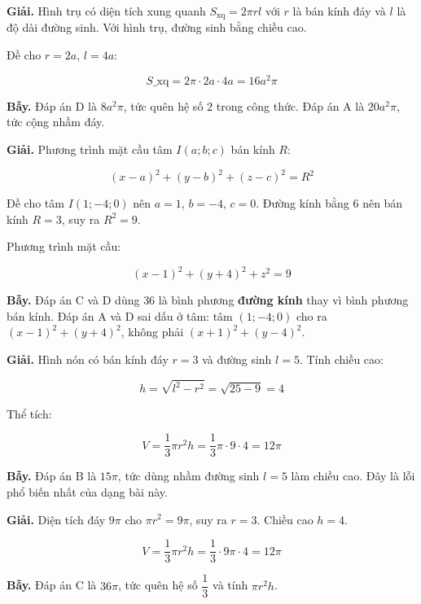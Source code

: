 \documentclass[11pt, a4paper]{article}
\begin{document}
\begin{dapan}[3 — Đáp án B]
\textbf{Giải.} Hình trụ có diện tích xung quanh $S_{\text{xq}} = 2\pi r l$ với $r$ là bán kính đáy và $l$ là độ dài đường sinh. Với hình trụ, đường sinh bằng chiều cao.

Đề cho $r = 2a$, $l = 4a$:

$$S\_{\text{xq}} = 2\pi \cdot 2a \cdot 4a = 16a^2\pi$$

\textbf{Bẫy.} Đáp án D là $8a^2\pi$, tức quên hệ số $2$ trong công thức. Đáp án A là $20a^2\pi$, tức cộng nhầm đáy.
\end{dapan}

\begin{dapan}[4 — Đáp án B]
\textbf{Giải.} Phương trình mặt cầu tâm $I(a;b;c)$ bán kính $R$:

$$(x-a)^2 + (y-b)^2 + (z-c)^2 = R^2$$

Đề cho tâm $I(1;-4;0)$ nên $a = 1$, $b = -4$, $c = 0$. Đường kính bằng $6$ nên bán kính $R = 3$, suy ra $R^2 = 9$.

Phương trình mặt cầu:

$$(x-1)^2 + (y+4)^2 + z^2 = 9$$

\textbf{Bẫy.} Đáp án C và D dùng $36$ là bình phương \textbf{đường kính} thay vì bình phương bán kính. Đáp án A và D sai dấu ở tâm: tâm $(1;-4;0)$ cho ra $(x-1)^2 + (y+4)^2$, không phải $(x+1)^2 + (y-4)^2$.
\end{dapan}

\begin{dapan}[5 — Đáp án A]
\textbf{Giải.} Hình nón có bán kính đáy $r = 3$ và đường sinh $l = 5$. Tính chiều cao:

$$h = \sqrt{l^2 - r^2} = \sqrt{25 - 9} = 4$$

Thể tích:

$$V = \frac{1}{3}\pi r^2 h = \frac{1}{3}\pi \cdot 9 \cdot 4 = 12\pi$$

\textbf{Bẫy.} Đáp án B là $15\pi$, tức dùng nhầm đường sinh $l = 5$ làm chiều cao. Đây là lỗi phổ biến nhất của dạng bài này.
\end{dapan}

\begin{dapan}[6 — Đáp án B]
\textbf{Giải.} Diện tích đáy $9\pi$ cho $\pi r^2 = 9\pi$, suy ra $r = 3$. Chiều cao $h = 4$.

$$V = \frac{1}{3}\pi r^2 h = \frac{1}{3} \cdot 9\pi \cdot 4 = 12\pi$$

\textbf{Bẫy.} Đáp án C là $36\pi$, tức quên hệ số $\dfrac{1}{3}$ và tính $\pi r^2 h$.
\end{dapan}
\end{document}
